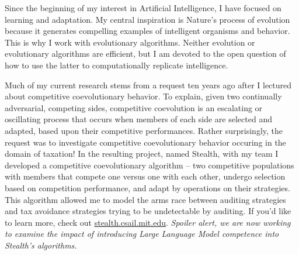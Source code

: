 \documentclass[12pt,bibliography=numbered]{article}
\begin{document}
%
%

\label{Evolutionary inspiration and algorithms}
\vspace{-0.5in}
\noindent 
Since the beginning of my interest in Artificial Intelligence, I have focused on learning and adaptation.
My central inspiration is Nature's process of evolution because it generates compelling examples of intelligent organisms and behavior.  
This is why I work with evolutionary algorithms.
Neither evolution or evolutionary algorithms are efficient, but I am devoted to the open question of how to use the latter to computationally replicate intelligence.

\label{STEALTH}
Much of my current research stems from a 
request ten years ago after I lectured about competitive coevolutionary behavior. 
To explain, given  two continually adversarial, competing sides, competitive coevolution is an escalating or oscillating process that occurs when members of each side are selected and adapted, based upon their competitive performances.
Rather surprisingly, the request was to investigate competitive coevolutionary behavior occuring in the domain of taxation! In the resulting project, named Stealth, with my team I developed a competitive coevolutionary algorithm --  two competitive populations with members that compete one versus one with each other, undergo selection based on competition performance, and adapt by operations on  their strategies. This algorithm allowed me to model the arms race between auditing strategies and tax avoidance strategies trying  to be undetectable by auditing. If you'd like to learn more, check out \url{stealth.csail.mit.edu}.  \textit{Spoiler alert, we are now working to examine the impact of introducing Large Language Model competence into Stealth's algorithms.}
\end{document}
